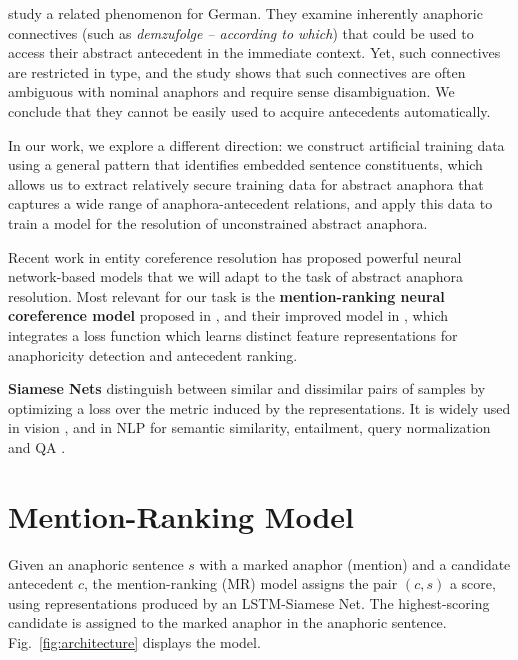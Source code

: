 \documentclass[11pt,letterpaper]{article}
\begin{document}
\citet{stede:grishina:2016:demzufolge} study a related phenomenon for German. They examine inherently anaphoric connectives 
(such as {\em demzufolge -- according to which}) that
could be used to access their abstract antecedent in the immediate context. Yet, such connectives are restricted in type, and the study shows that such connectives are often ambiguous with nominal anaphors and 
require sense disambiguation. We conclude that they cannot be easily used to acquire antecedents automatically.

In our work, we explore a different direction: we construct artificial training data using a general pattern that identifies embedded sentence constituents, which allows us to extract relatively secure training data for abstract anaphora that captures a wide range of anaphora-antecedent relations, and apply this data to train a model for the resolution of unconstrained abstract anaphora.

Recent work in entity coreference resolution has proposed powerful neural network-based models that we will adapt to the task of abstract anaphora resolution. Most relevant for our task is the \textbf{mention-ranking neural coreference model} proposed in \citet{clark2015entity}, and their improved model in \citet{clark2016deep}, which integrates a loss function \citep{wiseman2015learning} which learns distinct feature representations for anaphoricity detection and antecedent ranking.


\textbf{Siamese Nets} distinguish between similar and dissimilar pairs of samples by optimizing a loss over the metric induced by the representations. It is widely used in vision \cite{chopra2005learning}, and 
in NLP for semantic similarity, entailment, query normalization and QA \citep{mueller2016siamese, neculoiu-versteegh-rotaru:2016:RepL4NLP, Das2016TogetherWS}. 


 	
	\section{Mention-Ranking Model}
Given an anaphoric sentence $s$ with a marked anaphor (mention) 
and a candidate antecedent $c$, the mention-ranking (MR) model assigns  the pair $(c,s)$ a score, using re\-pre\-sen\-ta\-tions produced by an LSTM-Siamese Net.
The highest-scoring candidate is as\-sig\-ned to the marked anaphor in the anaphoric sentence. Fig.\ \ref{fig:architecture} displays the model.
\end{document}
